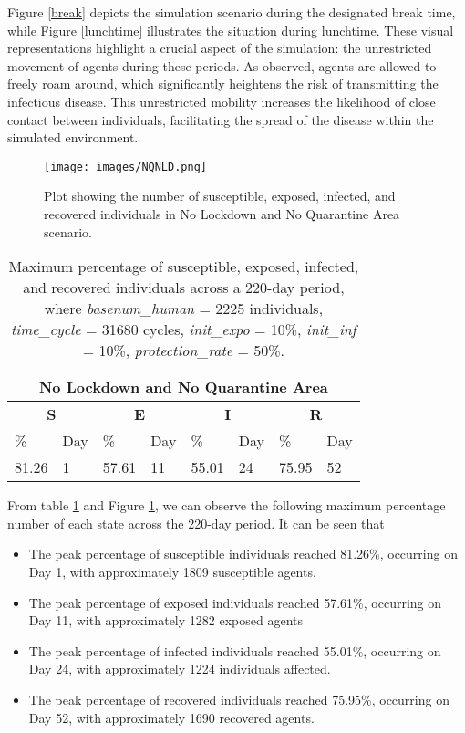 Figure \ref{break} depicts the simulation scenario during the designated break time, while Figure \ref{lunchtime} illustrates the situation during lunchtime. These visual representations highlight a crucial aspect of the simulation: the unrestricted movement of agents during these periods. As observed, agents are allowed to freely roam around, which significantly heightens the risk of transmitting the infectious disease. This unrestricted mobility increases the likelihood of close contact between individuals, facilitating the spread of the disease within the simulated environment.
\begin{figure}[H]
\centering
\texttt{[image: images/NQNLD.png]}
\caption{Plot showing the number of susceptible, exposed, infected, and recovered individuals in No Lockdown and No Quarantine Area scenario. }
\label{LD1} 
\end{figure}
\begin{table} [H]
\centering
\begin{tabular}{|l|l|l|l|l|l|l|l|}
	\hline
	\multicolumn{8}{|c|}{\textbf{No Lockdown and No Quarantine Area}}\\
	\hline
	\multicolumn{2}{|c|}{\textbf{S}} &  \multicolumn{2}{|c|}{\textbf{E}}&  \multicolumn{2}{|c|}{\textbf{I}}&  \multicolumn{2}{|c|}{\textbf{R}}\\
	\hline
	\%& Day & \% & Day & \%  & Day & \% & Day \\
	\hline
	81.26& 1 &57.61& 11&  55.01& 24& 75.95&52\\
	\hline
\end{tabular}
\caption{Maximum percentage of susceptible, exposed, infected, and recovered individuals across a 220-day period, where \textit{basenum\_human} = 2225 individuals, \textit{time\_cycle} = 31680 cycles, \textit{init\_expo} = 10\%, \textit{init\_inf} = 10\%,  \textit{protection\_rate} = 50\%.}
\label{LD1_Max}
\end{table}
From table \ref{LD1_Max} and Figure \ref{LD1}, we can observe the following maximum percentage number of each state across the 220-day period. It can be seen that 

\begin{itemize}

\item The peak percentage of susceptible individuals reached 81.26\%, occurring on Day 1, with approximately 1809 susceptible agents.
\item The peak percentage of exposed individuals reached 57.61\%, occurring on Day 11, with approximately 1282 exposed agents
\item The peak percentage of infected individuals reached 55.01\%, occurring on Day 24, with approximately 1224 individuals affected.
\item The peak percentage of recovered individuals reached 75.95\%, occurring on Day 52, with approximately 1690 recovered agents. 
\end{itemize}

